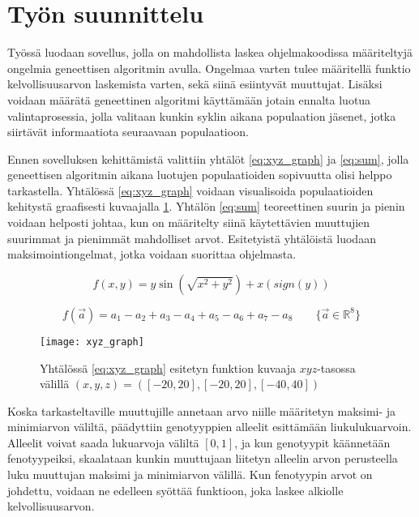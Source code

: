 \section{Työn suunnittelu} \label{suunnittelu}

Työssä luodaan sovellus, jolla on mahdollista laskea ohjelmakoodissa määriteltyjä ongelmia geneettisen algoritmin avulla.
Ongelmaa varten tulee määritellä funktio kelvollisuusarvon laskemista varten, sekä siinä esiintyvät muuttujat.
Lisäksi voidaan määrätä geneettinen algoritmi käyttämään jotain ennalta luotua valintaprosessia, jolla valitaan kunkin syklin aikana
populaation jäsenet, jotka siirtävät informaatiota seuraavaan populaatioon.

Ennen sovelluksen kehittämistä valittiin yhtälöt \ref{eq:xyz_graph} ja \ref{eq:sum}, jolla geneettisen algoritmin
aikana luotujen populaatioiden sopivuutta olisi helppo tarkastella. Yhtälössä \ref{eq:xyz_graph} voidaan visualisoida
populaatioiden kehitystä graafisesti kuvaajalla \ref{fig:xyz_graph}. Yhtälön \ref{eq:sum} teoreettinen suurin ja pienin
voidaan helposti johtaa, kun on määritelty siinä käytettävien muuttujien suurimmat ja pienimmät mahdolliset arvot. Esitetyistä yhtälöistä
luodaan maksimointiongelmat, jotka voidaan suorittaa ohjelmasta.

\begin{equation}
	\label{eq:xyz_graph}
	f(x,y) = y \sin{ \left( \sqrt {x^2 + y^2} \right) } + x \left( sign(y) \right)
\end{equation}

\begin{equation}
	\label{eq:sum}
	f(\vec a) = a_1 - a_2 + a_3 - a_4 + a_5 - a_6 + a_7 - a_8 \qquad
	\{\vec a \in \mathbb R^8\}
\end{equation}

\begin{figure}[H]
	\caption{
		Yhtälössä \ref{eq:xyz_graph} esitetyn funktion kuvaaja \(xyz\)-tasossa välillä
		\((x,y,z) = ([-20, 20], [-20, 20], [-40, 40])\)
	}
	\centering
	\texttt{[image: xyz\_graph]}
	\label{fig:xyz_graph}
\end{figure}

Koska tarkasteltaville muuttujille annetaan arvo niille määritetyn maksimi- ja minimiarvon väliltä, päädyttiin
genotyyppien alleelit esittämään liukulukuarvoin. Alleelit voivat saada lukuarvoja väliltä \([0, 1]\), ja kun
genotyypit käännetään fenotyypeiksi, skaalataan kunkin muuttujaan liitetyn alleelin arvon
perusteella luku muuttujan maksimi ja minimiarvon välillä. Kun fenotyypin arvot on johdettu, voidaan ne
edelleen syöttää funktioon, joka laskee alkiolle kelvollisuusarvon.

